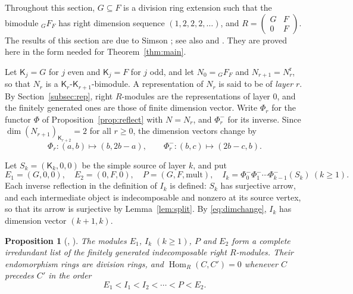 \documentclass[11pt,a4paper]{amsart}
\newtheorem{proposition}[theorem]{Proposition}
\numberwithin{equation}{section}
\newcommand{\Hom}{\operatorname{Hom}}
\newcommand{\Ksf}{\mathsf{K}}
\newcommand{\rr}{\mathrm{r}}
\begin{document}
Throughout this section, $G\subseteq F$ is a division ring extension such that the bimodule ${}_GF_F$ has right dimension sequence $(1,2,2,2,\dots)$, and $R=\left(\begin{smallmatrix}G&F\\0&F\end{smallmatrix}\right)$. The results of this section are due to Simson \cite{Si97}; see also \cite[Section 6]{Ga18} and \cite[Section 1]{Sa}. They are proved here in the form needed for Theorem~\ref{thm:main}.

Let $\Ksf_j=G$ for $j$ even and $\Ksf_j=F$ for $j$ odd, and let $N_0={}_GF_F$ and $N_{r+1}=N_r^{\rr}$, so that $N_r$ is a $\Ksf_r$-$\Ksf_{r+1}$-bimodule. A representation of $N_r$ is said to be of \emph{layer} $r$. By Section~\ref{subsec:rep}, right $R$-modules are the representations of layer $0$, and the finitely generated ones are those of finite dimension vector. Write $\Phi_r$ for the functor $\Phi$ of Proposition~\ref{prop:reflect} with $N=N_r$, and $\Phi_r^-$ for its inverse. Since $\dim(N_{r+1})_{\Ksf_{r+2}}=2$ for all $r\ge0$, the dimension vectors change by
\begin{equation}\label{eq:dimchange}
\Phi_r\colon(a,b)\mapsto(b,2b-a),\qquad \Phi_r^-\colon(b,c)\mapsto(2b-c,b).
\end{equation}

Let $S_k=(\Ksf_k,0,0)$ be the simple source of layer $k$, and put
\[
E_1=(G,0,0),\quad E_2=(0,F,0),\quad P=(G,F,\text{mult}),\quad I_k=\Phi_0^-\Phi_1^-\cdots\Phi_{k-1}^-(S_k)\ (k\ge1).
\]
Each inverse reflection in the definition of $I_k$ is defined: $S_k$ has surjective arrow, and each intermediate object is indecomposable and nonzero at its source vertex, so that its arrow is surjective by Lemma~\ref{lem:split}. By \eqref{eq:dimchange}, $I_k$ has dimension vector $(k+1,k)$.

\begin{proposition}[{\cite{Si97}, \cite[Section 6]{Ga18}}]\label{prop:class}
The modules $E_1$, $I_k$ $(k\ge1)$, $P$ and $E_2$ form a complete irredundant list of the finitely generated indecomposable right $R$-modules. Their endomorphism rings are division rings, and $\Hom_R(C,C')=0$ whenever $C$ precedes $C'$ in the order
\begin{equation}\label{eq:order}
E_1<I_1<I_2<\cdots<P<E_2.
\end{equation}
\end{proposition}
\end{document}
